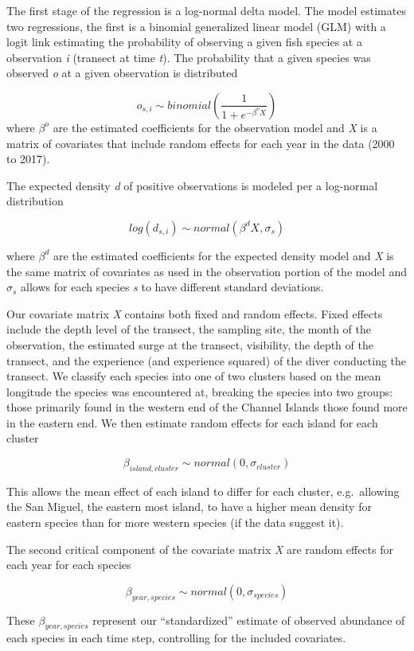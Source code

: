 \documentclass[twoside,12pt,final]{ucthesis-CA2012}
\begin{document}
\begin{ucmainmatter}
The first stage of the regression is a log-normal delta model. The model
estimates two regressions, the first is a binomial generalized linear
model (GLM) with a logit link estimating the probability of observing a
given fish species at a observation \emph{i} (transect at time
\emph{t}). The probability that a given species was observed \emph{o} at
a given observation is distributed

\[o_{s,i} \sim binomial(\frac{1}{1 +e^{-\beta^{o}{X}}}) \] where
\(\beta^{o}\) are the estimated coefficients for the observation model
and \emph{X} is a matrix of covariates that include random effects for
each year in the data (2000 to 2017).

The expected density \emph{d} of positive observations is modeled per a
log-normal distribution

\[log(d_{s,i}) \sim normal(\beta^{d}X, \sigma_s)\]

where \(\beta^{d}\) are the estimated coefficients for the expected
density model and \emph{X} is the same matrix of covariates as used in
the observation portion of the model and \(\sigma_s\) allows for each
species \emph{s} to have different standard deviations.

Our covariate matrix \emph{X} contains both fixed and random effects.
Fixed effects include the depth level of the transect, the sampling
site, the month of the observation, the estimated surge at the transect,
visibility, the depth of the transect, and the experience (and
experience squared) of the diver conducting the transect. We classify
each species into one of two clusters based on the mean longitude the
species was encountered at, breaking the species into two groups: those
primarily found in the western end of the Channel Islands those found
more in the eastern end. We then estimate random effects for each island
for each cluster

\[\beta_{island,cluster} \sim normal(0,\sigma_{cluster})\]

This allows the mean effect of each island to differ for each cluster,
e.g.~allowing the San Miguel, the eastern most island, to have a higher
mean density for eastern species than for more western species (if the
data suggest it).

The second critical component of the covariate matrix \emph{X} are
random effects for each year for each species

\[\beta_{year,species} \sim normal(0,\sigma_{species})\]

These \(\beta_{year,species}\) represent our ``standardized'' estimate
of observed abundance of each species in each time step, controlling for
the included covariates.


\end{ucmainmatter}
\end{document}
